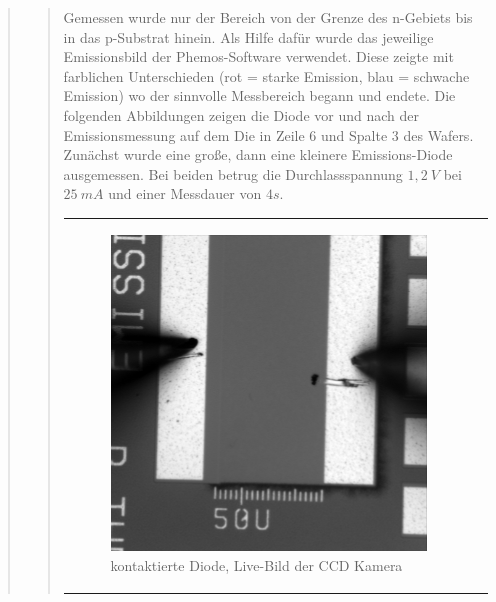 \begin{quote}
\begin{quote}
        Gemessen wurde nur der Bereich von der Grenze des n-Gebiets bis in
        das p-Substrat hinein. Als Hilfe dafür wurde das jeweilige Emissionsbild
        der Phemos-Software verwendet. Diese zeigte mit farblichen Unterschieden
        (rot = starke Emission, blau = schwache Emission) wo der sinnvolle
        Messbereich begann und endete. Die folgenden Abbildungen zeigen die
        Diode vor und nach der Emissionsmessung auf dem Die in Zeile $6$ und
        Spalte $3$ des Wafers. Zunächst wurde eine große, dann eine kleinere
        Emissions-Diode ausgemessen. Bei beiden betrug die Durchlassspannung
        $1,2\ V$ bei $25\ mA$ und einer Messdauer von $4s$.
        
         \begin{center}
                \begin{tabular}{ll}
    
                \hspace{-10em}
                    \begin{minipage}{0.6\textwidth}
    
                        \begin{figure}[H]
                            \label{fig:}
                            \includegraphics[scale=0.25, trim = 0cm 0cm 0cm
                            0cm,
                            clip]{./Emissionsbilder/eins/nach_Kontaktierung_vorMessung.jpg}
                            \caption{kontaktierte Diode, Live-Bild der CCD
                            Kamera}
                        \end{figure}
    

\end{minipage}
\end{tabular}
\end{center}
\end{quote}
\end{quote}
